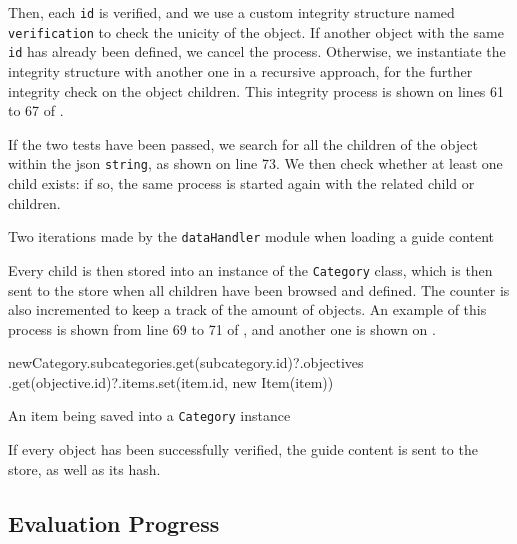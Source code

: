 Then, each \texttt{id} is verified, and we use a custom integrity structure named \texttt{verification} to check the unicity of the object. If another object with the same \texttt{id} has already been defined, we cancel the process. Otherwise, we instantiate the integrity structure with another one in a recursive approach, for the further integrity check on the object children. This integrity process is shown on lines 61 to 67 of .

If the two tests have been passed, we search for all the children of the object within the \gls{json} \texttt{string}, as shown on line 73. We then check whether at least one child exists: if so, the same process is started again with the related child or children.

\begin{listing}[!ht] 
	\caption{Two iterations made by the \texttt{dataHandler} module when loading a guide content}
	\label{lst:app_implementation_store_iteration}
\end{listing}

Every child is then stored into an instance of the \texttt{Category} class, which is then sent to the store when all children have been browsed and defined. The counter is also incremented to keep a track of the amount of objects. An example of this process is shown from line 69 to 71 of , and another one is shown on .

\begin{listing}[!ht] 
	\begin{javascriptcode}
newCategory.subcategories.get(subcategory.id)?.objectives
.get(objective.id)?.items.set(item.id, new Item(item))
	\end{javascriptcode}
	\caption{An item being saved into a \texttt{Category} instance}
	\label{lst:app_implementation_store_iteration_saved}
\end{listing}

If every object has been successfully verified, the guide content is sent to the store, as well as its hash.


\subsection{Evaluation Progress}
\label{subsec:app_implementation_progress}

